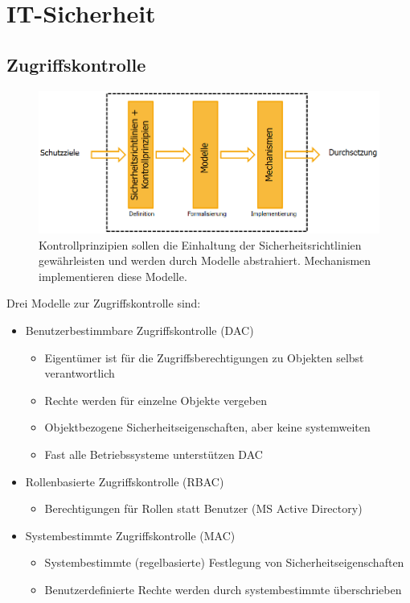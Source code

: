 \documentclass[a4paper,12pt,leqno]{article}
\begin{document}
\section{IT-Sicherheit}

\subsection{Zugriffskontrolle}

\begin{figure}[h!]
\centering
\includegraphics[scale=0.5]{Grafiken/Sicherheitsmodellentwicklung.png}
\caption{Kontrollprinzipien sollen die Einhaltung der Sicherheitsrichtlinien gewährleisten und werden durch Modelle abstrahiert. Mechanismen implementieren diese Modelle.}
\end{figure}
Drei Modelle zur Zugriffskontrolle sind:\\

\begin{itemize}
\item Benutzerbestimmbare Zugriffskontrolle (DAC)
	\begin{itemize}
	\item Eigentümer ist für die Zugriffsberechtigungen zu Objekten selbst verantwortlich
	\item Rechte werden für einzelne Objekte vergeben
	\item Objektbezogene Sicherheitseigenschaften, aber keine systemweiten
	\item Fast alle Betriebssysteme unterstützen DAC
	\end{itemize}
\item Rollenbasierte Zugriffskontrolle (RBAC)
	\begin{itemize}
	\item Berechtigungen für Rollen statt Benutzer (MS Active Directory)
	\end{itemize}
\item Systembestimmte Zugriffskontrolle (MAC)
	\begin{itemize}
	\item Systembestimmte (regelbasierte) Festlegung von Sicherheitseigenschaften
	\item Benutzerdefinierte Rechte werden durch systembestimmte überschrieben
	\end{itemize}
\end{itemize}
\end{document}
